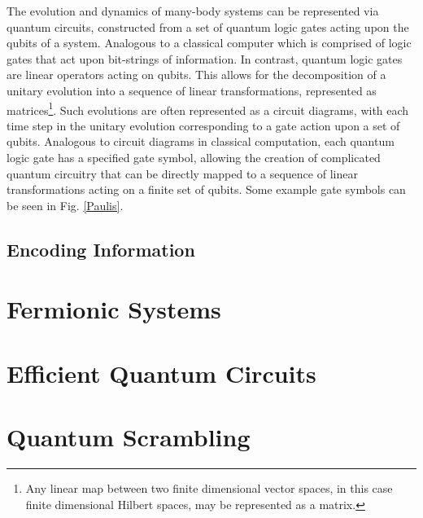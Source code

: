 The evolution and dynamics of many-body systems can be represented via quantum circuits, constructed from 
a set of quantum logic gates acting upon the qubits of a system. Analogous to a classical computer which 
is comprised of logic gates that act upon bit-strings of information.
In contrast, quantum logic gates are linear operators acting on qubits. This allows for the decomposition 
of a unitary evolution into a sequence of linear transformations, represented as matrices\footnote{Any linear map between two finite dimensional vector spaces, in this case finite dimensional Hilbert spaces, may be represented as a matrix. }. 
Such evolutions are often represented as a circuit diagrams, with each time step in the unitary evolution corresponding to a gate action upon a set of qubits.
Analogous to circuit diagrams in
classical computation, each quantum logic gate has a specified gate symbol, allowing the creation of complicated quantum circuitry that can be directly
mapped to a sequence of linear transformations acting on a finite set of qubits.
Some example gate symbols can be seen in Fig. \ref{Paulis}.












\subsection{Encoding Information}


\section{Fermionic Systems}

\section{Efficient Quantum Circuits}

\section{Quantum Scrambling}